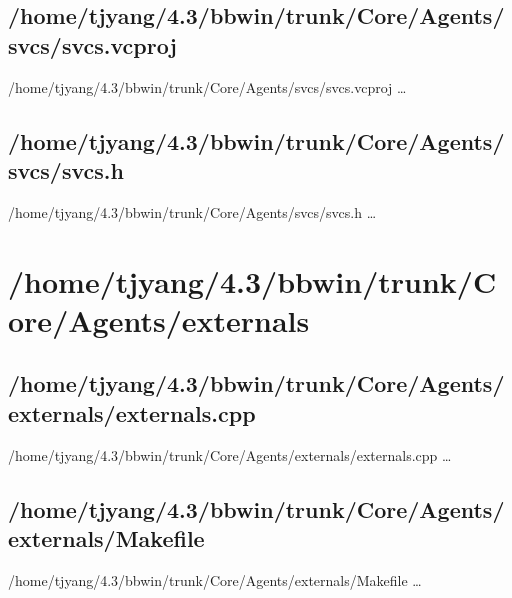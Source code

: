 \subsection{/home/tjyang/4.3/bbwin/trunk/Core/Agents/svcs/svcs.vcproj}
\lstset{numberstyle=\tiny,numbers=left,
   breaklines=true,
   stepnumber=1,numbersep=5pt,firstnumber=1,
   xleftmargin=12pt,showstringspaces=false}
\noindent /home/tjyang/4.3/bbwin/trunk/Core/Agents/svcs/svcs.vcproj  \ldots



\subsection{/home/tjyang/4.3/bbwin/trunk/Core/Agents/svcs/svcs.h}
\lstset{numberstyle=\tiny,numbers=left,
   breaklines=true,
   stepnumber=1,numbersep=5pt,firstnumber=1,
   xleftmargin=12pt,showstringspaces=false}
\noindent /home/tjyang/4.3/bbwin/trunk/Core/Agents/svcs/svcs.h  \ldots



\section{/home/tjyang/4.3/bbwin/trunk/Core/Agents/externals}


\subsection{/home/tjyang/4.3/bbwin/trunk/Core/Agents/externals/externals.cpp}
\lstset{numberstyle=\tiny,numbers=left,
   breaklines=true,
   stepnumber=1,numbersep=5pt,firstnumber=1,
   xleftmargin=12pt,showstringspaces=false}
\noindent /home/tjyang/4.3/bbwin/trunk/Core/Agents/externals/externals.cpp  \ldots



\subsection{/home/tjyang/4.3/bbwin/trunk/Core/Agents/externals/Makefile}
\lstset{numberstyle=\tiny,numbers=left,
   breaklines=true,
   stepnumber=1,numbersep=5pt,firstnumber=1,
   xleftmargin=12pt,showstringspaces=false}
\noindent /home/tjyang/4.3/bbwin/trunk/Core/Agents/externals/Makefile  \ldots



